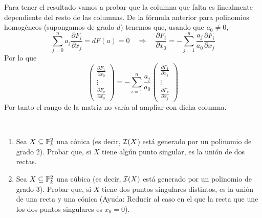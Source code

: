 \documentclass[twoside]{article}
\begin{document}
\begin{solucion}
\begin{enumerate}
Para tener el resultado vamos a probar que la columna que falta es linealmente dependiente del resto de las columnas. De la fórmula anterior para polinomios homogéneos (supongamos de grado $d$) tenemos que, usando que $a_0\neq0$,
$$
\sum_{j=0}^n a_j \frac{\partial F_i}{\partial x_j}=dF(a) = 0 \quad \Longrightarrow \quad \frac{\partial F_i}{\partial x_0} = -\sum_{j=1}^n \frac{a_j}{a_0} \frac{\partial F_i}{\partial x_j}
$$
Por lo que
$$
\begin{pmatrix}
 \frac{\partial F_1}{\partial x_0}\\
 \vdots\\
  \frac{\partial F_k}{\partial x_0}
\end{pmatrix} = -\sum_{i=1}^n  \frac{a_j}{a_0} \begin{pmatrix}
 \frac{\partial F_1}{\partial x_j}\\
 \vdots\\
  \frac{\partial F_k}{\partial x_j}
\end{pmatrix}
$$
Por tanto el rango de la matriz no varía al ampliar con dicha columna.
\end{enumerate}
\end{solucion}


\newpage
\begin{ejercicio}{6}\
 
\begin{enumerate}
\item\label{1} Sea $X \subseteq \mathbb{P}^2_k$ una cónica (es decir, $\mathcal{I}(X$) está generado por
un polinomio de grado 2). Probar que, si $X$ tiene algún punto singular,
es la unión de dos rectas.

\item\label{2} Sea $X \subseteq \mathbb{P}^2_k$ una cúbica (es decir, $\mathcal{I}(X)$ está generado por un polinomio
de grado 3). Probar que, si $X$ tiene dos puntos singulares distintos, es la
unión de una recta y una cónica (Ayuda: Reducir al caso en el que la recta
que une los dos puntos singulares es $x_0 = 0$).

\end{enumerate}
\end{ejercicio}
\end{document}
